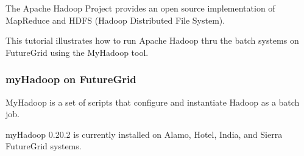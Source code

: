 The Apache Hadoop Project provides an open source implementation of MapReduce and HDFS (Hadoop Distributed File System).

This tutorial illustrates how to run Apache Hadoop thru the batch systems on FutureGrid using the MyHadoop tool.

\subsubsection{myHadoop on FutureGrid}

MyHadoop is a set of scripts that configure and instantiate Hadoop as a batch job.

myHadoop 0.20.2 is currently installed on Alamo, Hotel, India, and Sierra FutureGrid systems.

